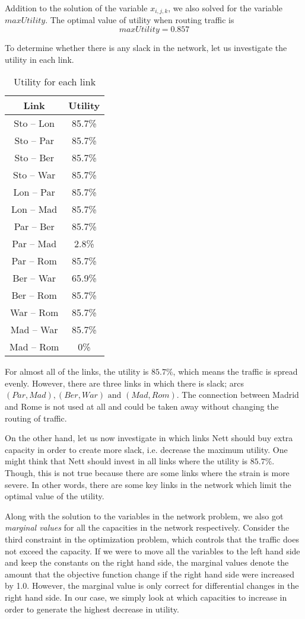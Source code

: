 Addition to the solution of the variable $x_{i,j,k}$, we also solved for the variable $maxUtility$. The optimal value of utility when routing traffic is $$maxUtility = 0.857$$

To determine whether there is any slack in the network, let us investigate the utility in each link.

\begin{table}[H]
\centering
\caption{Utility for each link}
\label{}
\begin{tabular}{|c|c|} \hline
        Link & Utility				\\ \hline
Sto -- Lon & 85.7\%   \\
Sto -- Par & 85.7\%        \\
Sto -- Ber & 85.7\%     \\
Sto -- War & 85.7\%		\\
Lon -- Par & 85.7\%    \\
Lon -- Mad & 85.7\%       \\
Par -- Ber & 85.7\%    \\
Par -- Mad & 2.8\%     \\
Par -- Rom & 85.7\%    \\
Ber -- War & 65.9\%       \\
Ber -- Rom & 85.7\%     \\
War -- Rom & 85.7\%    \\
Mad -- War & 85.7\%        \\
Mad -- Rom & 0\%      \\ \hline
\end{tabular}
\end{table}

For almost all of the links, the utility is $85.7\%$, which means the traffic is spread evenly. However, there are three links in which there is slack; arcs $(Par,Mad), (Ber,War) \text{ and } (Mad,Rom)$. The connection between Madrid and Rome is not used at all and could be taken away without changing the routing of traffic.

On the other hand, let us now investigate in which links Nett should buy extra capacity in order to create more slack, i.e. decrease the maximum utility. One might think that Nett should invest in all links where the utility is $85.7\%$. Though, this is not true because there are some links where the strain is more severe. In other words, there are some key links in the network which limit the optimal value of the utility.

Along with the solution to the variables in the network problem, we also got \textit{marginal values} for all the capacities in the network respectively. Consider the third constraint in the optimization problem, which controls that the traffic does not exceed the capacity. If we were to move all the variables to the left hand side and keep the constants on the right hand side, the marginal values denote the amount that the objective function change if the right hand side were increased by 1.0. However, the marginal value is only correct for differential changes in the right hand side. In our case, we simply look at which capacities to increase in order to generate the highest decrease in utility.

